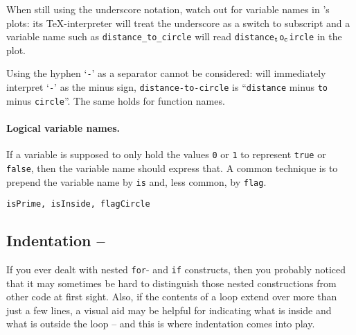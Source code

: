 When still using the underscore notation, watch out for variable names in \matlab{}'s plots: its \TeX-interpreter will treat the underscore as a switch to subscript and a variable name such as \lstinline!distance_to_circle! will read \lstinline!distance!$_{\text{\lstinline!t!}}$\lstinline!o!$_{\text{\lstinline!c!}}$\lstinline!ircle! in the plot.

\begin{remark}
Using the hyphen `\lstinline!-!' as a separator cannot be considered:
\matlab{} will immediately interpret `\lstinline!-!' as the minus sign,
\lstinline!distance-to-circle! is ``\lstinline!distance! minus \lstinline!to!
minus \lstinline!circle!''. The same holds for function names.
\end{remark}


\paragraph{Logical variable names.}
If a variable is supposed to only hold the values \lstinline!0! or
\lstinline!1! to represent \lstinline!true! or \lstinline!false!, then the
variable name should express that. A common technique is to prepend the
variable name by \lstinline!is! and, less common, by \lstinline!flag!.
\begin{lstlisting}
isPrime, isInside, flagCircle
\end{lstlisting}


\subsection{Indentation -- \cleansymbol\cleansymbol\cleansymbol\cleansymbol}

If you ever dealt with nested \lstinline!for!- and \lstinline!if! constructs,
then you probably noticed that it may sometimes be hard to distinguish those
nested constructions from other code at first sight. Also, if the contents of
a loop extend over more than just a few lines, a visual aid may be helpful for
indicating what is inside and what is outside the loop -- and this is where
indentation comes into play.

